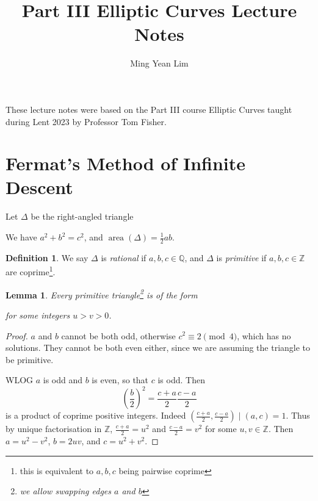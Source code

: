 \documentclass[11pt]{article}
\title{Part III Elliptic Curves Lecture Notes}
\author{Ming Yean Lim}
\theoremstyle{definition}
\newtheorem*{definition*}{Definition}
\theoremstyle{plain}
\newtheorem{lemma}[definition]{Lemma}
\theoremstyle{remark}
\DeclareMathOperator{\area}{area}
\newcommand{\ZZ}{\mathbb{Z}}
\newcommand{\QQ}{\mathbb{Q}}
\begin{document}
\maketitle

\noindent These lecture notes were based on the Part III course Elliptic Curves taught during Lent 2023 by Professor Tom Fisher.



\section{Fermat's Method of Infinite Descent}

Let $\Delta$ be the right-angled triangle
\begin{center}
\end{center}
We have $a^2 + b^2 = c^2$, and $\area(\Delta) = \frac{1}{2} a b$.

\begin{definition*}
    We say $\Delta$ is \emph{rational} if $a, b, c \in \QQ$, and $\Delta$ is \emph{primitive} if $a, b, c \in \ZZ$ are coprime\footnote{this is equivalent to $a, b, c$ being pairwise coprime}.
\end{definition*}

\begin{lemma}\label{lem:1_1}
    Every primitive triangle\footnote{we allow swapping edges $a$ and $b$} is of the form
    \begin{center}
    \end{center}
    for some integers $u > v > 0$.
\end{lemma}
\begin{proof}
    $a$ and $b$ cannot be both odd, otherwise $c^2 \equiv 2 \pmod{4}$, which has no solutions. They cannot be both even either, since we are assuming the triangle to be primitive.

    WLOG $a$ is odd and $b$ is even, so that $c$ is odd. Then
    \begin{equation*}
        \left(\frac{b}{2}\right)^2 = \frac{c+a}{2} \frac{c-a}{2}
    \end{equation*}
    is a product of coprime positive integers. Indeed $(\frac{c+a}{2}, \frac{c-a}{2}) \mid (a, c) = 1$. Thus by unique factorisation in $\ZZ$, $\frac{c+a}{2} = u^2$ and $\frac{c-a}{2} = v^2$ for some $u, v \in \ZZ$. Then $a = u^2 - v^2$, $b = 2uv$, and $c = u^2 + v^2$.
\end{proof}
\end{document}
